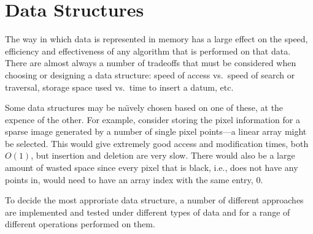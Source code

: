 
\part{Data Structures}
\label{prt:data_structures}

The way in which data is represented in memory has a large effect on the speed,
efficiency and effectiveness of any algorithm that is performed on that data.
There are almost always a number of tradeoffs that must be considered when
choosing or designing a data structure: speed of access vs.\ speed of search or
traversal, storage space used vs.\ time to insert a datum, etc.

Some data structures may be na\"{\i}vely chosen based on one of these, at the
expence of the other. For example, consider storing the pixel information for a
sparse image generated by a number of single pixel points---a linear array
might be selected. This would give extremely good access and modification
times, both $O(1)$, but insertion and deletion are very slow. There would also
be a large amount of wasted space since every pixel that is black, i.e., does
not have any points in, would need to have an array index with the same entry,
$0$.

To decide the most approriate data structure, a number of different approaches
are implemented and tested under different types of data and for a range of
different operations performed on them.
